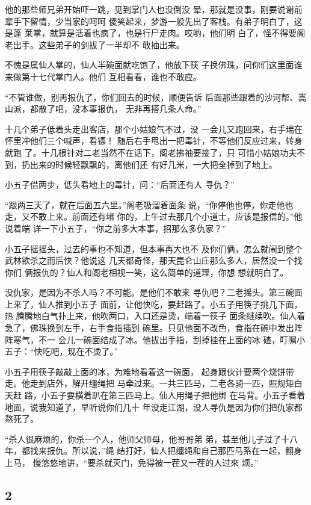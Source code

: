 他的那些师兄弟开始吓一跳，见到掌门人也没倒没
晕，那就是没事，刚要说谢前辈手下留情，少当家的呵呵
傻笑起来，梦游一般先出了客栈。有弟子明白了，这是蓬
莱掌，就算是活着也疯了，也是行尸走肉。哎哟，他们明
白了，怪不得要阁老出手。这些弟子的剑拔了一半却不
敢抽出来。

不愧是属仙人掌的，仙人半碗面就吃饱了，他放下筷
子换佛珠，问你们这里面谁来做第十七代掌门人。他们
互相看看，谁也不敢应。

“不管谁做，别再报仇了，你们回去的时候，顺便告诉
后面那些跟着的沙河帮、嵩山派，都散了吧，没本事报仇，
无非再搭几条人命。”

十几个弟子低着头走出客店，那个小姑娘气不过，没
一会儿又跑回来，右手瑞在怀里冲他们三个喊声，看镖！
随后右手甩出一把毒针，不等他们反应过来，转身就跑
了。十几根针对二老当然不在话下，阁老拂袖要接了，只
可惜小姑娘功夫不到，扔出来的时候轻飘飘的，离他们还
有好几米，一大把全掉到了地上。

小五子借两步，低头看地上的毒针，问：“后面还有人
寻仇？”

“跟两三天了，就在后面五六里。”阁老吸溜着面条
说，“你停他也停，你走他也走，又不敢上来。前面还有堵
你的，上午过去那几个小道士，应该是报信的。”他说着端
详一下小五子，“你之前多大本事，招那么多仇家？”

小五子摇摇头，过去的事也不知道，但本事再大也不
及你们俩，怎么就闹到整个武林欲杀之而后快？他说这
几天都奇怪，那天昆仑山庄那么多人，居然没一个找你们
俩报仇的？仙人和阁老相视一笑，这么简单的道理，你想
想就明白了。

没仇家，是因为不杀人吗？不可能。是他们不敢来
寻仇吧？二老摇头。第三碗面上来了，仙人推到小五子
面前，让他快吃，要赶路了。小五子用筷子挑几下面，热
腾腾地白气扑上来，他吹两口，入口还是烫，端着一筷子
面条继续吹。仙人着急了，佛珠换到左手，右手食指插到
碗里。只见他面不改色，食指在碗中发出阵阵寒气，不一
会儿一碗面结成了冰。他拔出手指，刮掉挂在上面的冰
碴，叮嘱小五子：“快吃吧，现在不烫了。”

小五子用筷子敲敲上面的冰，为难地看着这一碗面，
起身跟伙计要两个烧饼带走。他走到店外，解开缰绳把
马牵过来。一共三匹马，二老各骑一匹，照规矩白天赶
路，小五子要横着趴在第三匹马上。仙人用绳子把他绑
在马背。小五子看着地面，说我知道了，早听说你们几十
年没走江湖，没人寻仇是因为你们把仇家都熬死了。

“杀人很麻烦的，你杀一个人，他师父师母，他哥哥弟
弟，甚至他儿子过了十八年，都找来报仇。所以说，”绳
结打好，仙人把缰绳和自己那匹马系在一起，翻身上马，
慢悠悠地讲，“要杀就灭门，免得被一茬又一茬的人过來
烦。”
\newline

{\centering\subsection{2}}

